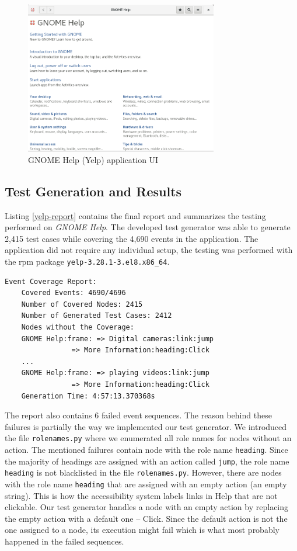 \begin{figure}[H]
	\centering
	\includegraphics[width=0.75\textwidth,clip]{obrazky-figures/yelp-ui.png}
	\caption{GNOME Help (Yelp) application UI}
	\label{yelp_ui}
\end{figure}

\subsection{Test Generation and Results}\label{firefox_bug}
Listing \ref{yelp-report} contains the final report and summarizes the testing performed on \textit{GNOME Help}. The developed test generator was able to generate 2,415 test cases while covering the 4,690 events in the application. The application did not require any individual setup, the testing was performed with the rpm package \texttt{yelp-3.28.1-3.el8.x86\_64}.

\begin{lstlisting}[caption={
Final test generator report for GNOME Help},label={yelp-report}]
    Event Coverage Report:
    Covered Events: 4690/4696
    Number of Covered Nodes: 2415
    Number of Generated Test Cases: 2412
    Nodes without the Coverage:
    GNOME Help:frame: => Digital cameras:link:jump 
                => More Information:heading:Click
    ...
    GNOME Help:frame: => playing videos:link:jump
                => More Information:heading:Click 
    Generation Time: 4:57:13.370368s
\end{lstlisting}

The report also contains 6 failed event sequences. The reason behind these failures is partially the way we implemented our test generator. We introduced the file \texttt{rolenames.py} where we enumerated all role names for nodes without an action. The mentioned failures contain node with the role name \texttt{heading}. Since the majority of headings are assigned with an action called \texttt{jump}, the role name \texttt{heading} is not blacklisted in the file \texttt{rolenames.py}. However, there are nodes with the role name \texttt{heading} that are assigned with an empty action (an empty string). This is how the accessibility system labels links in Help that are not clickable. Our test generator handles a node with an empty action by replacing the empty action with a default one -- Click. Since the default action is not the one assigned to a node, its execution might fail which is what most probably happened in the failed sequences. 

